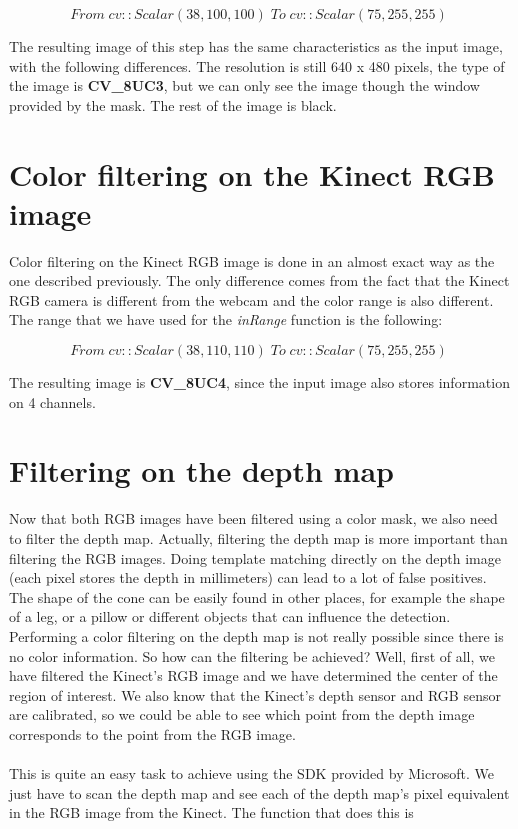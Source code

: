 $$ From \; cv::Scalar(38 , 100 , 100) \; To \; cv::Scalar(75 ,255 ,255 ) \; $$

\noindent
The resulting image of this step has the same characteristics as the input image, with the following differences. The resolution is still 640 x 480 pixels, the type of the image is {\bf CV\_8UC3}, but we can only see the image though the window provided by the mask. The rest of the image is black. 

\section{Color filtering on the Kinect RGB image}
\noindent
Color filtering on the Kinect RGB image is done in an almost exact way as the one described previously. The only difference comes from the fact that the Kinect RGB camera is different from the webcam and the color range is also different. 
\\
The range that we have used for the \emph{inRange} function is the following:

$$ From \; cv::Scalar(38 , 110 , 110) \; To \; cv::Scalar(75 ,255 ,255 ) \; $$

\noindent
The resulting image is {\bf CV\_8UC4}, since the input image also stores information on 4 channels. 

\section{Filtering on the depth map}
\noindent
Now that both RGB images have been filtered using a color mask, we also need to filter the depth map. Actually, filtering the depth map is more important than filtering the RGB images. Doing template matching directly on the depth image (each pixel stores the depth in millimeters) can lead to a lot of false positives. The shape of the cone can be easily found in other places, for example the shape of a leg, or a pillow or different objects that can influence the detection. 
\\
Performing a color filtering on the depth map is not really possible since there is no color information. So how can the filtering be achieved? Well, first of all, we have filtered the Kinect's RGB image and we have determined the center of the region of interest. We also know that the Kinect's depth sensor and RGB sensor are calibrated, so we could be able to see which point from the depth image corresponds to the point from the RGB image. 
\\\\
This is quite an easy task to achieve using the SDK provided by Microsoft. We just have to scan the depth map and see each of the depth map's pixel equivalent in the RGB image from the Kinect. The function that does this is 


